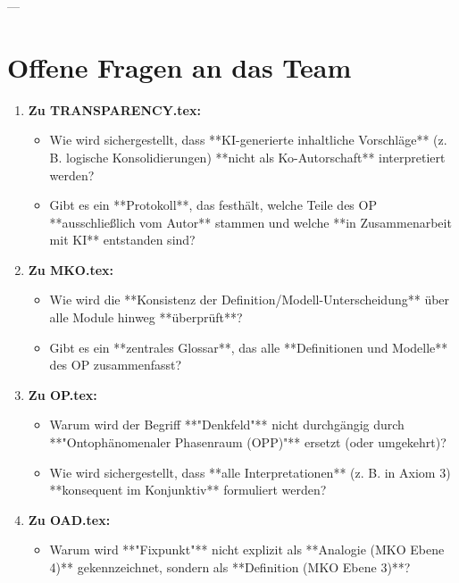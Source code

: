 \documentclass[11pt,a4paper]{article}
\begin{document}
---
\section*{Offene Fragen an das Team}

\begin{enumerate}
    \item \textbf{Zu TRANSPARENCY.tex:}
    \begin{itemize}
        \item Wie wird sichergestellt, dass **KI-generierte inhaltliche Vorschläge** (z. B. logische Konsolidierungen) **nicht als Ko-Autorschaft** interpretiert werden?
        \item Gibt es ein **Protokoll**, das festhält, welche Teile des OP **ausschließlich vom Autor** stammen und welche **in Zusammenarbeit mit KI** entstanden sind?
    \end{itemize}

    \item \textbf{Zu MKO.tex:}
    \begin{itemize}
        \item Wie wird die **Konsistenz der Definition/Modell-Unterscheidung** über alle Module hinweg **überprüft**?
        \item Gibt es ein **zentrales Glossar**, das alle **Definitionen und Modelle** des OP zusammenfasst?
    \end{itemize}

    \item \textbf{Zu OP.tex:}
    \begin{itemize}
        \item Warum wird der Begriff **"Denkfeld"** nicht durchgängig durch **"Ontophänomenaler Phasenraum (OPP)"** ersetzt (oder umgekehrt)?
        \item Wie wird sichergestellt, dass **alle Interpretationen** (z. B. in Axiom 3) **konsequent im Konjunktiv** formuliert werden?
    \end{itemize}

    \item \textbf{Zu OAD.tex:}
    \begin{itemize}
        \item Warum wird **"Fixpunkt"** nicht explizit als **Analogie (MKO Ebene 4)** gekennzeichnet, sondern als **Definition (MKO Ebene 3)**?
    \end{itemize}


\end{enumerate}
\end{document}

